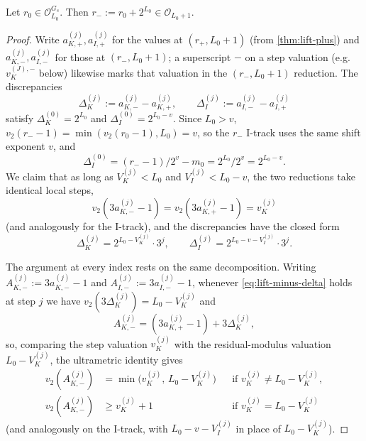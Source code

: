 \documentclass[11pt,reqno]{amsart}
\newcommand{\Obs}{\mathcal{O}}
\newcommand{\Vk}{V_{K}}
\newcommand{\Vi}{V_{I}}
\newcommand{\vk}{v_{K}}
\newcommand{\vtwo}{v_{2}}
\begin{document}
\begin{theorem}\label{thm:lift-minus}
Let $r_0 \in \Obs_{L_0}^{G_s}$. Then $r_- := r_0 + 2^{L_0} \in \Obs_{L_0+1}$.
\end{theorem}

\begin{proof}
Write $a_{K,+}^{(j)}, a_{I,+}^{(j)}$ for the values at $(r_+, L_0+1)$
(from \cref{thm:lift-plus}) and $a_{K,-}^{(j)}, a_{I,-}^{(j)}$ for
those at $(r_-, L_0+1)$; a superscript $-$ on a step valuation (e.g.\
$\vk^{(J),-}$ below) likewise marks that valuation in the $(r_-, L_0+1)$
reduction. The discrepancies
\[
\Delta_K^{(j)} := a_{K,-}^{(j)} - a_{K,+}^{(j)}, \qquad \Delta_I^{(j)} := a_{I,-}^{(j)} - a_{I,+}^{(j)}
\]
satisfy $\Delta_K^{(0)} = 2^{L_0}$ and $\Delta_I^{(0)} = 2^{L_0 - v}$. Since
$L_0 > v$, $\vtwo(r_- - 1) = \min(\vtwo(r_0 - 1), L_0) = v$, so the $r_-$
I-track uses the same shift exponent $v$, and
\[
\Delta_I^{(0)} = (r_- - 1)/2^v - m_0 = 2^{L_0}/2^v = 2^{L_0 - v}.
\]
We claim that as long as $\Vk^{(j)} < L_0$ and $\Vi^{(j)} < L_0 - v$, the two
reductions take identical local steps,
\begin{equation}\label{eq:lift-minus-vmatch}
v_2\!\left(3 a_{K,-}^{(j)} - 1\right) = v_2\!\left(3 a_{K,+}^{(j)} - 1\right) = \vk^{(j)}
\end{equation}
(and analogously for the I-track), and the discrepancies have the closed
form
\begin{equation}\label{eq:lift-minus-delta}
\Delta_K^{(j)} = 2^{L_0 - \Vk^{(j)}} \cdot 3^j, \qquad \Delta_I^{(j)} = 2^{L_0 - v - \Vi^{(j)}} \cdot 3^j.
\end{equation}

The argument at every index rests on the same decomposition. Writing
$A_{K,-}^{(j)} := 3 a_{K,-}^{(j)} - 1$ and $A_{I,-}^{(j)} := 3 a_{I,-}^{(j)} - 1$,
whenever \eqref{eq:lift-minus-delta} holds at step $j$ we have
$\vtwo(3\Delta_K^{(j)}) = L_0 - \Vk^{(j)}$ and
\[
A_{K,-}^{(j)} = (3 a_{K,+}^{(j)} - 1) + 3 \Delta_K^{(j)},
\]
so, comparing the step valuation $\vk^{(j)}$ with the residual-modulus
valuation $L_0 - \Vk^{(j)}$, the ultrametric identity gives
\begin{align*}
\vtwo(A_{K,-}^{(j)}) &= \min\bigl(\vk^{(j)},\, L_0 - \Vk^{(j)}\bigr)
  &&\text{if } \vk^{(j)} \ne L_0 - \Vk^{(j)},\\
\vtwo(A_{K,-}^{(j)}) &\ge \vk^{(j)} + 1
  &&\text{if } \vk^{(j)} = L_0 - \Vk^{(j)}
\end{align*}
(and analogously on the I-track, with $L_0 - v - \Vi^{(j)}$ in place of
$L_0 - \Vk^{(j)}$).


\end{proof}
\end{document}
